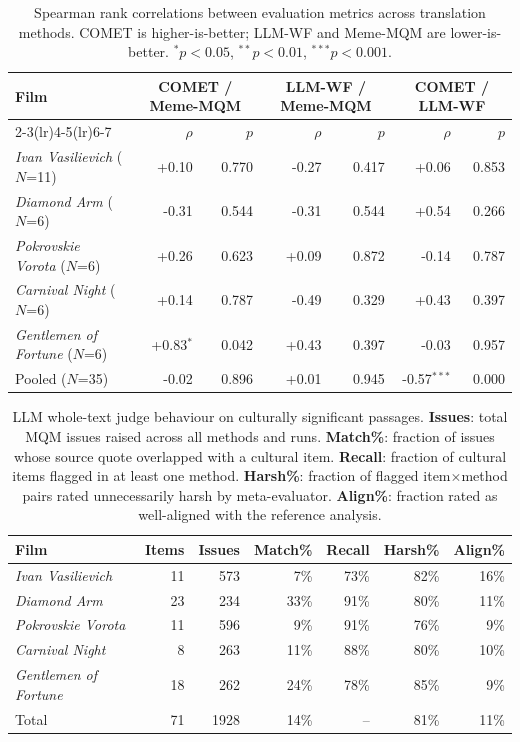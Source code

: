 \begin{table}[t]
\centering
\small
\begin{tabular}{lrrrrrr}
\toprule
\multirow{2}{*}{\textbf{Film}} & \multicolumn{2}{c}{\textbf{COMET / Meme-MQM}} & \multicolumn{2}{c}{\textbf{LLM-WF / Meme-MQM}} & \multicolumn{2}{c}{\textbf{COMET / LLM-WF}} \\
\cmidrule(lr){2-3}\cmidrule(lr){4-5}\cmidrule(lr){6-7}
 & $\rho$ & $p$ & $\rho$ & $p$ & $\rho$ & $p$ \\
\midrule
\textit{Ivan Vasilievich} ($N$=11) & +0.10 & 0.770 & -0.27 & 0.417 & +0.06 & 0.853 \\
\textit{Diamond Arm} ($N$=6) & -0.31 & 0.544 & -0.31 & 0.544 & +0.54 & 0.266 \\
\textit{Pokrovskie Vorota} ($N$=6) & +0.26 & 0.623 & +0.09 & 0.872 & -0.14 & 0.787 \\
\textit{Carnival Night} ($N$=6) & +0.14 & 0.787 & -0.49 & 0.329 & +0.43 & 0.397 \\
\textit{Gentlemen of Fortune} ($N$=6) & +0.83$^{*}$ & 0.042 & +0.43 & 0.397 & -0.03 & 0.957 \\
\midrule
Pooled ($N$=35) & -0.02 & 0.896 & +0.01 & 0.945 & -0.57$^{***}$ & 0.000 \\
\bottomrule
\end{tabular}
\caption{Spearman rank correlations between evaluation metrics across translation methods. COMET is higher-is-better; LLM-WF and Meme-MQM are lower-is-better. $^{*}p<0.05$, $^{**}p<0.01$, $^{***}p<0.001$.}
\label{tab:correlations}
\end{table}

\begin{table}[t]
\centering
\small
\begin{tabular}{lrrrrrr}
\toprule
\textbf{Film} & \textbf{Items} & \textbf{Issues} & \textbf{Match\%} & \textbf{Recall} & \textbf{Harsh\%} & \textbf{Align\%} \\
\midrule
\textit{Ivan Vasilievich} & 11 & 573 & 7\% & 73\% & 82\% & 16\% \\
\textit{Diamond Arm} & 23 & 234 & 33\% & 91\% & 80\% & 11\% \\
\textit{Pokrovskie Vorota} & 11 & 596 & 9\% & 91\% & 76\% & 9\% \\
\textit{Carnival Night} & 8 & 263 & 11\% & 88\% & 80\% & 10\% \\
\textit{Gentlemen of Fortune} & 18 & 262 & 24\% & 78\% & 85\% & 9\% \\
\midrule
Total & 71 & 1928 & 14\% & -- & 81\% & 11\% \\
\bottomrule
\end{tabular}
\caption{LLM whole-text judge behaviour on culturally significant passages. \textbf{Issues}: total MQM issues raised across all methods and runs. \textbf{Match\%}: fraction of issues whose source quote overlapped with a cultural item. \textbf{Recall}: fraction of cultural items flagged in at least one method. \textbf{Harsh\%}: fraction of flagged item$\times$method pairs rated unnecessarily harsh by meta-evaluator. \textbf{Align\%}: fraction rated as well-aligned with the reference analysis.}
\label{tab:llm-wf-coverage}
\end{table}
